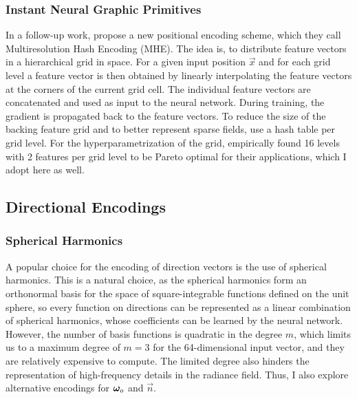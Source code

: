 \subsubsection{Instant Neural Graphic Primitives}
In a follow-up work, \textcite{muller2022} propose a new positional encoding scheme, which they call Multiresolution Hash Encoding (MHE).
The idea is, to distribute feature vectors in a hierarchical grid in space.
For a given input position $\vec{x}$ and for each grid level a feature vector is then obtained by linearly interpolating the feature vectors at the corners of the current grid cell.
The individual feature vectors are concatenated and used as input to the neural network.
During training, the gradient is propagated back to the feature vectors.
To reduce the size of the backing feature grid and to better represent sparse fields, \textcite{muller2022} use a hash table per grid level.
For the hyperparametrization of the grid, \textcite{muller2022} empirically found 16 levels with 2 features per grid level to be Pareto optimal for their applications, which I adopt here as well.

\subsection{Directional Encodings}

\subsubsection{Spherical Harmonics}
A popular choice for the encoding of direction vectors is the use of spherical harmonics.
This is a natural choice, as the spherical harmonics form an orthonormal basis for the space of square-integrable functions defined on the unit sphere, so every function on directions can be represented as a linear combination of spherical harmonics, whose coefficients can be learned by the neural network.
However, the number of basis functions is quadratic in the degree $m$, which limits us to a maximum degree of $m=3$ for the 64-dimensional input vector, and they are relatively expensive to compute.
The limited degree also hinders the representation of high-frequency details in the radiance field.
Thus, I also explore alternative encodings for ${\bm{\omega}_o}$ and $\vec{n}$.

